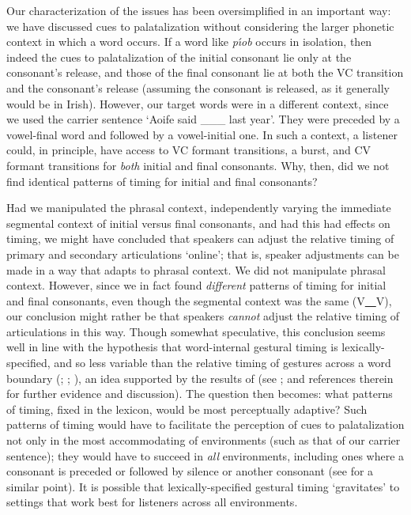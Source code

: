 \documentclass[output=paper,colorlinks,citecolor=brown]{langscibook}
\newcommand{\pal}{\ipa{ʲ}}
\newcommand{\vel}{\ipa{ˠ}}
\begin{document}
Our characterization of the issues has been oversimplified in an important way: we have discussed cues to palatalization without considering the larger phonetic context in which a word occurs. If a word like \emph{p\'{\i}ob}  occurs in isolation, then indeed the cues to palatalization of the initial consonant lie only at the consonant's release, and those of the final consonant lie at both the VC transition and the consonant's release (assuming the consonant is released, as it generally would be in Irish). However, our target words were in a different context, since we used the carrier sentence \ipa{[ˈd\vel uːr\pal t\pal\ ˈiːf\vel ə \_\_\_ əˈn\vel ʊr\vel ə]} `Aoife said \_\_\_ last year'. They were preceded by a vowel-final word and followed by a vowel-initial one. In such a context, a listener could, in principle, have access to VC formant transitions, a burst, and CV formant transitions for \emph{both} initial and final consonants. Why, then, did we not find identical patterns of timing for initial and final consonants? 

Had we manipulated the phrasal context, independently varying the immediate segmental context of initial versus final consonants, and had this had effects on timing, we might have concluded that speakers can adjust the relative timing of primary and secondary articulations `online'; that is, speaker adjustments can be made in a way that adapts to phrasal context. We did not manipulate phrasal context. However, since we in fact found \emph{different} patterns of timing for initial and final consonants, even though the segmental context was the same (V\uline{~~}V), our conclusion might rather be that speakers \emph{cannot} adjust the relative timing of articulations in this way. Though somewhat speculative, this conclusion seems well in line with the hypothesis that word-internal gestural timing is lexically-specified, and so less variable than the relative timing of gestures across a word boundary (\cite{Browman_Goldstein1988_syll_struc}; \cite{Byrd1996_phase_windows}; \cite{Browman_Goldstein2000_competing_coordination}), an idea supported by the results of \citet{Cho2001_boundaries_overlap} (see \cite{Strycharczuk2019_phonetics_morphology}; \cite{Mousikou2021_coarticulation_morphemes} and references therein for further evidence and discussion). The question then becomes: what patterns of timing, fixed in the lexicon, would be most perceptually adaptive? Such patterns of timing would have to facilitate the perception of cues to palatalization not only in the most accommodating of environments (such as that of our carrier sentence); they would have to succeed in \emph{all} environments, including ones where a consonant is preceded or followed by silence or another consonant (see \citealt[30--31]{Flemming2001_unified_model} for a similar point). It is possible that lexically-specified gestural timing `gravitates' to settings that work best for listeners across all environments.
\end{document}
